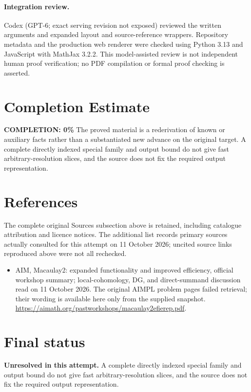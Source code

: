 \documentclass[11pt]{article}
\begin{document}
\paragraph{Integration review.} Codex (GPT-6; exact serving revision not exposed) reviewed the written arguments and expanded layout and source-reference wrappers. Repository metadata and the production web renderer were checked using Python 3.13 and JavaScript with MathJax 3.2.2. This model-assisted review is not independent human proof verification; no PDF compilation or formal proof checking is asserted.

\section{Completion Estimate}
\noindent\textbf{COMPLETION: 0\%}
The proved material is a rederivation of known or auxiliary facts rather than a substantiated new advance on the original target. A complete directly indexed special family and output bound do not give fast arbitrary-resolution slices, and the source does not fix the required output representation.
\section{References}
The complete original Sources subsection above is retained, including catalogue attribution and licence notices. The additional list records primary sources actually consulted for this attempt on 11 October 2026; uncited source links reproduced above were not all rechecked.
\begin{itemize}
\item AIM, Macaulay2: expanded functionality and improved efficiency, official workshop summary; local-cohomology, DG, and direct-summand discussion read on 11 October 2026. The original AIMPL problem pages failed retrieval; their wording is available here only from the supplied snapshot. \url{https://aimath.org/pastworkshops/macaulay2efierep.pdf}.
\end{itemize}
\section{Final status}
\textbf{Unresolved in this attempt.} A complete directly indexed special family and output bound do not give fast arbitrary-resolution slices, and the source does not fix the required output representation.
\end{document}
